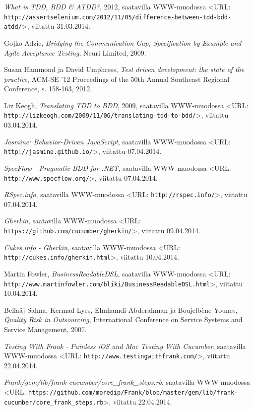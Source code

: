 \documentclass[finnish,nonumbib,nocopyright]{gradu2}
\begin{document}
\begin{thebibliography}{9}
\textit{What is TDD, BDD \& ATDD?}, 2012, saatavilla WWW-muodossa
<URL: \texttt{http://assertselenium.com/2012/11/05/difference-between-tdd-bdd-atdd/}>, viitattu 31.03.2014.

Gojko Adzic, \textit{Bridging the Communication Gap, Specification by Example and Agile Acceptance Testing},
Neuri Limited, 2009.

Susan Hammond ja David Umphress, \textit{Test driven development: the state of the practice},
ACM-SE '12 Proceedings of the 50th Annual Southeast Regional Conference, s. 158-163, 2012.

Liz Keogh, \textit{Translating TDD to BDD}, 2009, saatavilla WWW-muodossa
<URL: \texttt{http://lizkeogh.com/2009/11/06/translating-tdd-to-bdd/}>, viitattu 03.04.2014.

\textit{Jasmine: Behavior-Driven JavaScript}, saatavilla WWW-muodossa
<URL: \texttt{http://jasmine.github.io/}>, viitattu 07.04.2014.

\textit{SpecFlow - Pragmatic BDD for .NET}, saatavilla WWW-muodossa
<URL: \texttt{http://www.specflow.org/}>, viitattu 07.04.2014.

\textit{RSpec.info}, saatavilla WWW-muodossa
<URL: \texttt{http://rspec.info/}>, viitattu 07.04.2014.

\textit{Gherkin}, saatavilla WWW-muodossa
<URL: \texttt{https://github.com/cucumber/gherkin/}>, viitattu 09.04.2014.

\textit{Cukes.info - Gherkin}, saatavilla WWW-muodossa
<URL: \texttt{http://cukes.info/gherkin.html}>, viitattu 10.04.2014. 

Martin Fowler, \textit{BusinessReadableDSL}, saatavilla WWW-muodossa
<URL: \texttt{http://www.martinfowler.com/bliki/BusinessReadableDSL.html}>, viitattu 10.04.2014.

Bellaâj Salma, Kermad Lyes, Elmhamdi Abderahman ja Boujelbène Younes, \textit{Quality Risk in Outsourcing},
International Conference on Service Systems and Service Management, 2007.

\textit{Testing With Frank - Painless iOS and Mac Testing With Cucumber}, saatavilla WWW-muodossa
<URL: \texttt{http://www.testingwithfrank.com/}>, viitattu 22.04.2014.

\textit{Frank/gem/lib/frank-cucumber/core\_frank\_steps.rb}, saatavilla WWW-muodossa
<URL: \texttt{https://github.com/moredip/Frank/blob/master/gem/lib/frank-cucumber/core\_frank\_steps.rb}>, viitattu 22.04.2014.


\end{thebibliography}
\end{document}
